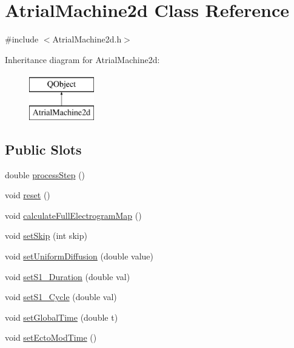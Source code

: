 \hypertarget{class_atrial_machine2d}{\section{Atrial\+Machine2d Class Reference}
\label{class_atrial_machine2d}
}


{\ttfamily \#include $<$Atrial\+Machine2d.\+h$>$}

Inheritance diagram for Atrial\+Machine2d\+:\begin{figure}[H]
\begin{center}
\leavevmode
\includegraphics[height=2.000000cm]{class_atrial_machine2d}
\end{center}
\end{figure}
\subsection*{Public Slots}
\begin{DoxyCompactItemize}
\item 
double \hyperlink{class_atrial_machine2d_a2a59d6433bd614ff51bc07227210b2e8}{process\+Step} ()
\item 
void \hyperlink{class_atrial_machine2d_a3c509a3d7d9da2b758caa7347bb3ea78}{reset} ()
\item 
void \hyperlink{class_atrial_machine2d_a9a600c1251eae56fe59c4188f1735a0b}{calculate\+Full\+Electrogram\+Map} ()
\item 
void \hyperlink{class_atrial_machine2d_a5e5d865f2142795acca445437cc2346d}{set\+Skip} (int skip)
\item 
void \hyperlink{class_atrial_machine2d_a2bc748b9fda32f5efe515474df2c85e6}{set\+Uniform\+Diffusion} (double value)
\item 
void \hyperlink{class_atrial_machine2d_a4edba6c43406c28e00e90acd0d8a1f1d}{set\+S1\+\_\+\+Duration} (double val)
\item 
void \hyperlink{class_atrial_machine2d_adda0c3f022e32b53d89f42b440336cd0}{set\+S1\+\_\+\+Cycle} (double val)
\item 
void \hyperlink{class_atrial_machine2d_abc84bef4b3b1a84a4959e820dea21fc3}{set\+Global\+Time} (double t)
\item 
void \hyperlink{class_atrial_machine2d_afeca8099f6767e7850ba1bd305dc9ed7}{set\+Ecto\+Mod\+Time} ()
\end{DoxyCompactItemize}
